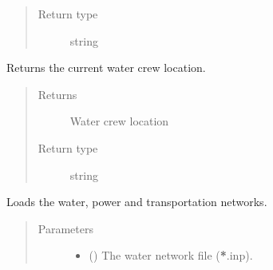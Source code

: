 \documentclass[letterpaper,10pt,english]{sphinxmanual}
\begin{document}
\begin{fulllineitems}
\begin{fulllineitems}
\begin{quote}
\begin{description}
\item[{Return type}] \leavevmode
\sphinxAtStartPar
string

\end{description}\end{quote}

\end{fulllineitems}


\begin{fulllineitems}
\label{\detokenize{apidoc:dreaminsg_integrated_model.src.network_sim_models.integrated_network.IntegratedNetwork.get_water_crew_loc}}
\sphinxAtStartPar
Returns the current water crew location.
\begin{quote}\begin{description}
\item[{Returns}] \leavevmode
\sphinxAtStartPar
Water crew location

\item[{Return type}] \leavevmode
\sphinxAtStartPar
string

\end{description}\end{quote}

\end{fulllineitems}


\begin{fulllineitems}
\label{\detokenize{apidoc:dreaminsg_integrated_model.src.network_sim_models.integrated_network.IntegratedNetwork.load_networks}}
\sphinxAtStartPar
Loads the water, power and transportation networks.
\begin{quote}\begin{description}
\item[{Parameters}] \leavevmode\begin{itemize}
\item {} 
\sphinxAtStartPar
{} () \textendash{} The water network file ({\color{red}\bfseries{}*}.inp).


\end{itemize}
\end{description}
\end{quote}
\end{fulllineitems}
\end{fulllineitems}
\end{document}
